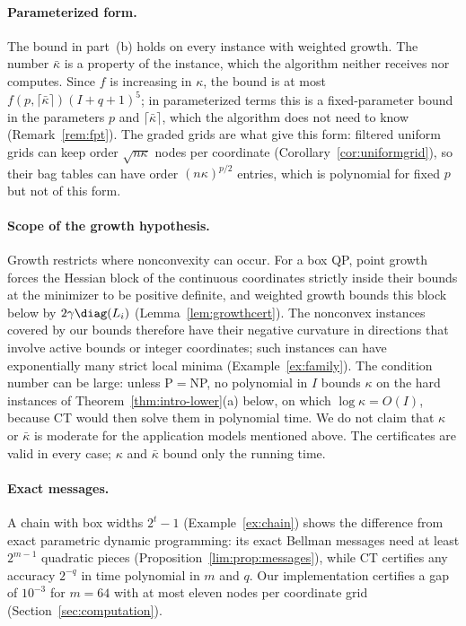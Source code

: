\paragraph{Parameterized form.}
The bound in part~(b) holds on every instance with weighted growth. The
number $\bar\kappa$ is a property of the instance, which the algorithm
neither receives nor computes. Since $f$ is increasing in $\kappa$, the bound
is at most $f(p,\lceil\bar\kappa\rceil)(I+q+1)^5$; in parameterized terms
this is a fixed-parameter bound in the parameters $p$ and
$\lceil\bar\kappa\rceil$, which the algorithm does not need to know
(Remark~\ref{rem:fpt}). The graded grids are what give this form: filtered
uniform grids can keep order $\sqrt{n\kappa}$ nodes per coordinate
(Corollary~\ref{cor:uniformgrid}), so their bag tables can have order
$(n\kappa)^{p/2}$ entries, which is polynomial for fixed $p$ but not of this
form.

\paragraph{Scope of the growth hypothesis.}
Growth restricts where nonconvexity can occur. For a box QP, point growth
forces the Hessian block of the continuous coordinates strictly inside their
bounds at the minimizer to be positive definite, and weighted growth bounds
this block below by $2\gamma\diag(L_i)$ (Lemma~\ref{lem:growthcert}). The
nonconvex instances covered by our bounds therefore have their negative
curvature in directions that involve active bounds or integer coordinates;
such instances can have exponentially many strict local minima
(Example~\ref{ex:family}). The condition number can be large: unless
P${}={}$NP, no polynomial in $I$ bounds $\kappa$ on the hard instances of
Theorem~\ref{thm:intro-lower}(a) below, on which $\log\kappa=O(I)$, because
CT would then solve them in polynomial time. We do not claim that $\kappa$ or
$\bar\kappa$ is moderate for the application models mentioned above. The certificates are
valid in every case; $\kappa$ and $\bar\kappa$ bound only the running time.

\paragraph{Exact messages.}
A chain with box widths $2^t-1$ (Example~\ref{ex:chain}) shows the difference
from exact parametric dynamic programming: its exact Bellman messages need at
least $2^{m-1}$ quadratic pieces (Proposition~\ref{lim:prop:messages}), while
CT certifies any accuracy $2^{-q}$ in time polynomial in $m$ and $q$. Our
implementation certifies a gap of $10^{-3}$ for $m=64$ with at most eleven
nodes per coordinate grid (Section~\ref{sec:computation}).

